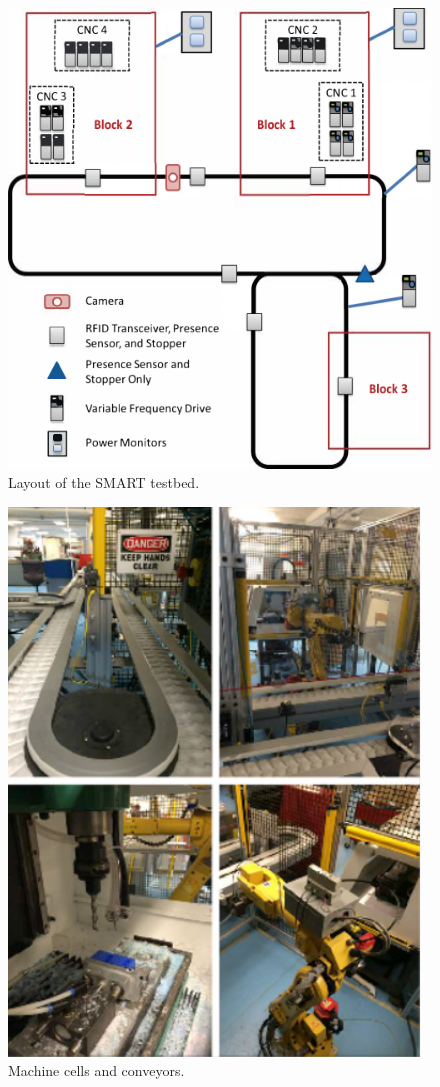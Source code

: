 \begin{figure}[t]
\centering
\includegraphics[width=0.7\columnwidth]{Figures/SMART_layout}
\caption{\small Layout of the SMART testbed.}
\label{fig:smart_layout}
\end{figure}

\begin{figure}[t]
\centering
\includegraphics[width=0.6\columnwidth]{Figures/SMART_photos}
\caption{\small Machine cells and conveyors.}
\label{fig:smart_photos}
\end{figure}



